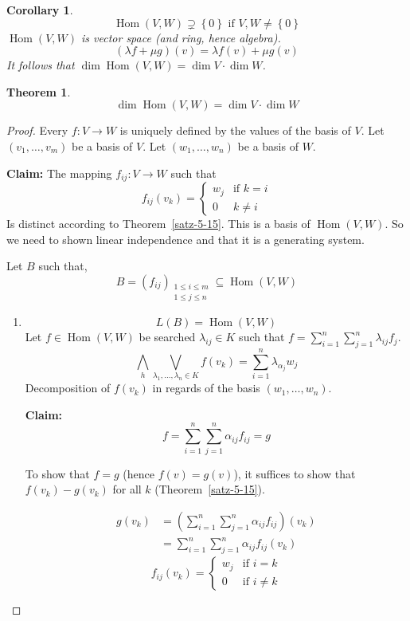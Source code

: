 \documentclass[a4paper,landscape,twocolumn]{article}
\newcommand\set[1]{\left\{#1\right\}}
\newtheorem{theorem}{Theorem}
\newtheorem{cor}{Corollary}
\DeclareMathOperator\Hom{Hom} %
\begin{document}
\begin{cor}
  \[ \Hom(V, W) \supsetneq \set{0} \text{ if } V,W \neq \set{0} \]
  $\Hom(V,W)$ is vector space (and ring, hence algebra).
  \[ (\lambda f + \mu g)(v) = \lambda f(v) + \mu g(v) \]
  It follows that $\dim{\Hom(V,W)} = \dim{V} \cdot \dim{W}$.
\end{cor}
\begin{theorem}
  \label{satz-5-18}
  \[ \dim{\Hom(V,W)} = \dim{V} \cdot \dim{W} \]
\end{theorem}
\begin{proof}
  Every $f: V \rightarrow W$ is uniquely defined by the values of the basis of $V$.
  Let $(v_1, \dots, v_m)$ be a basis of $V$. Let $(w_1, \dots, w_n)$ be a basis of $W$.

  \textbf{Claim:} The mapping $f_{ij}: V \rightarrow W$ such that
  \[
    f_{ij}(v_k) = \begin{cases}
      w_j & \text{if } k = i \\
      0 & k \neq i
    \end{cases}
  \]
  Is distinct according to Theorem~\ref{satz-5-15}.
  This is a basis of $\Hom(V, W)$. So we need to shown linear independence and
  that it is a generating system.

  Let $B$ such that,
  \[
    B = \left(f_{ij}\right)_{\substack{1 \leq i \leq m \\ 1 \leq j \leq n}}
    \subseteq \Hom(V, W)
  \]
  \begin{enumerate}
    \item
      \[ L(B) = \Hom(V, W) \]
      Let $f \in \Hom(V, W)$ be searched $\lambda_{ij} \in K$
      such that $f = \sum_{i=1}^n \sum_{j=1}^n \lambda_{ij} f_{j}$.
      \[ \bigwedge_{h} \bigvee_{\lambda_1,\dots,\lambda_n \in K} f(v_k) = \sum_{i=1}^n \lambda_{\alpha_j} w_j \]
      Decomposition of $f(v_k)$ in regards of the basis $(w_1, \dots, w_n)$.

      \textbf{Claim:}
      \[ f = \sum_{i=1}^n \sum_{j=1}^n \alpha_{ij} f_{ij} = g \]

      To show that $f = g$ (hence $f(v) = g(v)$),
      it suffices to show that $f(v_k) - g(v_k)$ for all $k$ (Theorem~\ref{satz-5-15}).

      \begin{align*}
        g(v_k) &= \left(\sum_{i=1}^n \sum_{j=1}^n \alpha_{ij} f_{ij}\right) (v_k) \\
          &= \sum_{i=1}^n \sum_{j=1}^n \alpha_{ij} f_{ij}(v_k)
      \end{align*}
      \[
        f_{ij}(v_k) = \begin{cases}
          w_j & \text{if } i = k \\
          0 & \text{if } i \neq k
        \end{cases}
      \]


\end{enumerate}
\end{proof}
\end{document}
